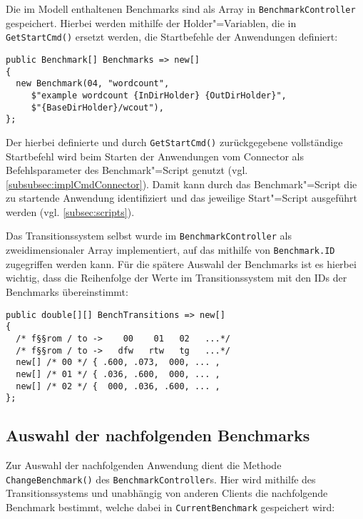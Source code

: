 Die im Modell enthaltenen Benchmarks sind als Array in \texttt{BenchmarkController} gespeichert.
Hierbei werden mithilfe der Holder"=Variablen, die in \texttt{GetStartCmd()} ersetzt werden, die Startbefehle der Anwendungen definiert:

\begin{lstlisting}[label=lst:benchmarkDefinition,style=cs,
caption={[Definition der verfügbaren Benchmarks im BenchmarkController]
    Definition der verfügbaren Benchmarks im \texttt{BenchmarkController} (gekürzt)}]
public Benchmark[] Benchmarks => new[]
{
  new Benchmark(04, "wordcount",
     $"example wordcount {InDirHolder} {OutDirHolder}",
     $"{BaseDirHolder}/wcout"),
};
\end{lstlisting}

Der hierbei definierte und durch \texttt{GetStartCmd()} zurückgegebene vollständige Startbefehl wird beim Starten der Anwendungen vom Connector als Befehlsparameter des Benchmark"=Script genutzt (vgl. \cref{subsubsec:implCmdConnector}).
Damit kann durch das Benchmark"=Script die zu startende Anwendung identifiziert und das jeweilige Start"=Script ausgeführt werden (vgl. \cref{subsec:scripts}).

Das Transitionssystem selbst wurde im \texttt{BenchmarkController} als zweidimensionaler Array implementiert, auf das mithilfe von \texttt{Benchmark.ID} zugegriffen werden kann.
Für die spätere Auswahl der Benchmarks ist es hierbei wichtig, dass die Reihenfolge der Werte im Transitionssystem mit den IDs der Benchmarks übereinstimmt:

\begin{lstlisting}[label=lst:transitionSystemImpl,style=cs,
caption={[Implementierung des Transitionssystems im BenchmarkController]
    Implementierung des Transitionssystems im \texttt{BenchmarkController} (gekürzt)}]
public double[][] BenchTransitions => new[]
{
  /* f§§rom / to ->    00    01   02   ...*/
  /* f§§rom / to ->   dfw   rtw   tg   ...*/
  new[] /* 00 */ { .600, .073,  000, ... ,
  new[] /* 01 */ { .036, .600,  000, ... ,
  new[] /* 02 */ {  000, .036, .600, ... ,
};
\end{lstlisting}

\subsection{Auswahl der nachfolgenden Benchmarks}
\label{subsec:selectionNextBenchmark}

Zur Auswahl der nachfolgenden Anwendung dient die Methode \texttt{ChangeBenchmark()} des \texttt{BenchmarkController}s.
Hier wird mithilfe des Transitionssystems und unabhängig von anderen Clients die nachfolgende Benchmark bestimmt, welche dabei in \texttt{CurrentBenchmark} gespeichert wird:


